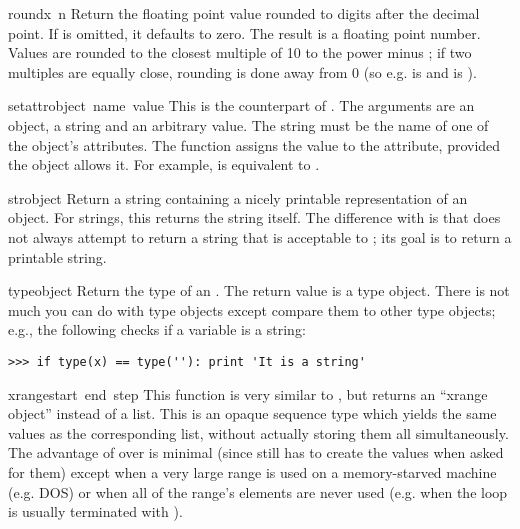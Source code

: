 \begin{funcdesc}{round}{x\, n}
  Return the floating point value  rounded to  digits
  after the decimal point.  If  is omitted, it defaults to zero.
  The result is a floating point number.  Values are rounded to the
  closest multiple of 10 to the power minus ; if two multiples
  are equally close, rounding is done away from 0 (so e.g.
   is  and  is ).
\end{funcdesc}

\begin{funcdesc}{setattr}{object\, name\, value}
  This is the counterpart of .  The arguments are an
  object, a string and an arbitrary value.  The string must be the name
  of one of the object's attributes.  The function assigns the value to
  the attribute, provided the object allows it.  For example,
   is equivalent to
  .
\end{funcdesc}

\begin{funcdesc}{str}{object}
Return a string containing a nicely printable representation of an
object.  For strings, this returns the string itself.  The difference
with  is that  does not
always attempt to return a string that is acceptable to ;
its goal is to return a printable string.
\end{funcdesc}

\begin{funcdesc}{type}{object}
  Return the type of an .  The return value is a type
  object.  There is not much you can do with type objects except compare
  them to other type objects; e.g., the following checks if a variable
  is a string:

\bcode\begin{verbatim}
>>> if type(x) == type(''): print 'It is a string'
\end{verbatim}\ecode
\end{funcdesc}

\begin{funcdesc}{xrange}{start\, end\, step}
This function is very similar to , but returns an
``xrange object'' instead of a list.  This is an opaque sequence type
which yields the same values as the corresponding list, without
actually storing them all simultaneously.  The advantage of
 over  is minimal (since 
still has to create the values when asked for them) except when a very
large range is used on a memory-starved machine (e.g. DOS) or when all
of the range's elements are never used (e.g. when the loop is usually
terminated with ).
\end{funcdesc}
